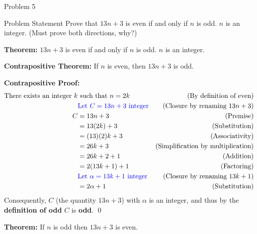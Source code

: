\begin{problem}{Problem 5}
    \begin{statement}{Problem Statement}
        Prove that $13n + 3$ is even if and only if $n$ is odd. $n$ is an integer. (Must prove both directions, why?)
    \end{statement}

    \begin{Highlight}[Solution]
        \textbf{Theorem:} $13n + 3$ is even if and only if $n$ is odd. $n$ is an integer. \vspace*{1em}

        \textbf{Contrapositive Theorem:} If $n$ is even, then $13n + 3$ is odd. \vspace*{1em}

        \textbf{Contrapositive Proof:} \newline
        \begin{align*}
            \text{There exists an integer } k & \text{ such that } n = 2k & \text{(By definition of even)} \\
            & \textcolor{blue}{\text{Let } C = 13n + 3 \text{ integer}} & \text{(Closure by renaming $13n + 3$)} \\
            C & = 13n + 3 & \text{(Premise)} \\
            & = 13(2k) + 3 & \text{(Substitution)} \\
            & = (13)(2)k + 3 & \text{(Associativity)} \\
            & = 26k + 3 & \text{(Simplification by multiplication)} \\
            & = 26k + 2 + 1 & \text{(Addition)} \\
            & = 2(13k + 1) + 1 & \text{(Factoring)} \\
            & \textcolor{blue}{\text{Let } \alpha = 13k + 1 \text{ integer}} & \text{(Closure by renaming $13k + 1$)} \\
            & = 2\alpha + 1 & \text{(Substitution)}
        \end{align*}
        Consequently, $C$ (the quantity $13n + 3$) with $\alpha$ is an integer, and thus by the \textbf{definition of odd} $C$ is \textbf{odd}. \qed

        \vspace*{1em}
    
        \textbf{Theorem:} If $n$ is odd then $13n + 3$ is even. \vspace*{1em}
    

\end{Highlight}
\end{problem}
